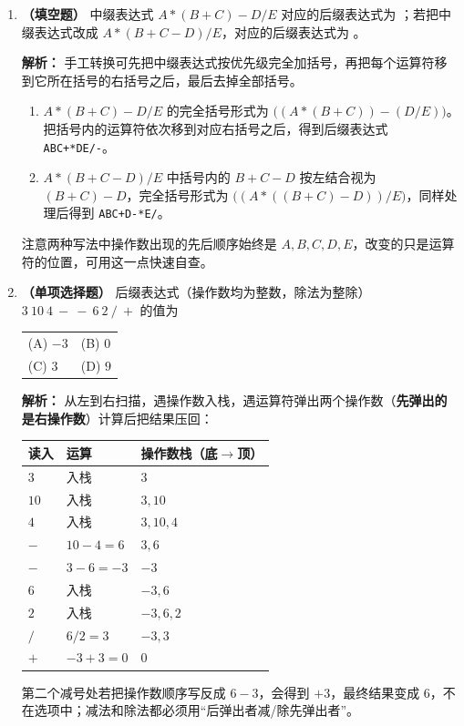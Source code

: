 \begin{enumerate}
\item \textbf{（填空题）} 中缀表达式 $A*(B+C)-D/E$ 对应的后缀表达式为 \underline{\qquad\qquad}；若把中缀表达式改成 $A*(B+C-D)/E$，对应的后缀表达式为 \underline{\qquad\qquad}。

\ifshowsolutions\par\noindent\textbf{解析：} 手工转换可先把中缀表达式按优先级完全加括号，再把每个运算符移到它所在括号的右括号之后，最后去掉全部括号。
\begin{enumerate}
\item[(1)] $A*(B+C)-D/E$ 的完全括号形式为 $\bigl((A*(B+C))-(D/E)\bigr)$。把括号内的运算符依次移到对应右括号之后，得到后缀表达式 \texttt{ABC+*DE/-}。
\item[(2)] $A*(B+C-D)/E$ 中括号内的 $B+C-D$ 按左结合视为 $(B+C)-D$，完全括号形式为 $\bigl((A*((B+C)-D))/E\bigr)$，同样处理后得到 \texttt{ABC+D-*E/}。
\end{enumerate}
注意两种写法中操作数出现的先后顺序始终是 $A,B,C,D,E$，改变的只是运算符的位置，可用这一点快速自查。
\par\noindent{}\else \answerarea \fi

\item \textbf{（单项选择题）} 后缀表达式（操作数均为整数，除法为整除）$3\ 10\ 4\ -\ -\ 6\ 2\ /\ +$ 的值为
\begin{center}
\begin{tabular}{ll}
(A) $-3$ & (B) $0$ \\[6pt]
(C) $3$ & (D) $9$
\end{tabular}
\end{center}

\ifshowsolutions\par\noindent\textbf{解析：} 从左到右扫描，遇操作数入栈，遇运算符弹出两个操作数（\textbf{先弹出的是右操作数}）计算后把结果压回：
\begin{center}
\begin{tabular}{lll}
\toprule
读入 & 运算 & 操作数栈（底$\to$顶） \\
\midrule
$3$ & 入栈 & $3$ \\
$10$ & 入栈 & $3,10$ \\
$4$ & 入栈 & $3,10,4$ \\
$-$ & $10-4=6$ & $3,6$ \\
$-$ & $3-6=-3$ & $-3$ \\
$6$ & 入栈 & $-3,6$ \\
$2$ & 入栈 & $-3,6,2$ \\
$/$ & $6/2=3$ & $-3,3$ \\
$+$ & $-3+3=0$ & $0$ \\
\bottomrule
\end{tabular}
\end{center}
第二个减号处若把操作数顺序写反成 $6-3$，会得到 $+3$，最终结果变成 $6$，不在选项中；减法和除法都必须用“后弹出者减/除先弹出者”。
\par\noindent{}\else \answerarea \fi


\end{enumerate}
